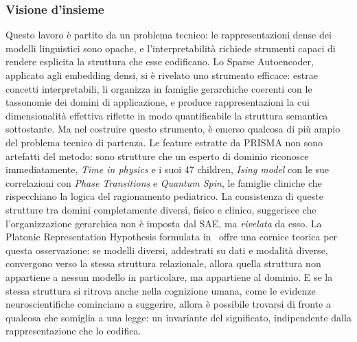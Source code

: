 \subsubsection{Visione d'insieme}
\label{subsubsec:visione_insieme}
Questo lavoro è partito da un problema tecnico: le rappresentazioni dense dei modelli linguistici sono opache, e l'interpretabilità richiede strumenti capaci di rendere esplicita la struttura che esse codificano. Lo Sparse Autoencoder, applicato agli embedding densi, si è rivelato uno strumento efficace: estrae concetti interpretabili, li organizza in famiglie gerarchiche coerenti con le tassonomie dei domini di applicazione, e produce rappresentazioni la cui dimensionalità effettiva riflette in modo quantificabile la struttura semantica sottostante.
Ma nel costruire questo strumento, è emerso qualcosa di più ampio del problema tecnico di partenza. Le feature estratte da PRISMA non sono artefatti del metodo: sono strutture che un esperto di dominio riconosce immediatamente, \textit{Time in physics} e i suoi 47 children, \textit{Ising model} con le sue correlazioni con \textit{Phase Transitions} e \textit{Quantum Spin}, le famiglie cliniche che rispecchiano la logica del ragionamento pediatrico. La consistenza di queste strutture tra domini completamente diversi, fisico e clinico, suggerisce che l'organizzazione gerarchica non è imposta dal SAE, ma \textit{rivelata} da esso.
La Platonic Representation Hypothesis formulata in~\parencite{huh2024platonic} offre una cornice teorica per questa osservazione: se modelli diversi, addestrati su dati e modalità diverse, convergono verso la stessa struttura relazionale, allora quella struttura non appartiene a nessun modello in particolare, ma appartiene al dominio. E se la stessa struttura si ritrova anche nella cognizione umana, come le evidenze neuroscientifiche cominciano a suggerire, allora è possibile trovarsi di fronte a qualcosa che somiglia a una legge: un invariante del significato, indipendente dalla rappresentazione che lo codifica.

